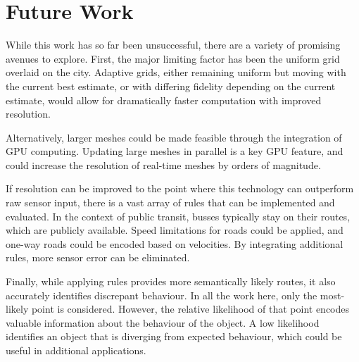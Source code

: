 \section{Future Work}

While this work has so far been unsuccessful, there are a variety of promising avenues to explore. First, the major limiting factor has been the uniform grid overlaid on the city. Adaptive grids, either remaining uniform but moving with the current best estimate, or with differing fidelity depending on the current estimate, would allow for dramatically faster computation with improved resolution.

Alternatively, larger meshes could be made feasible through the integration of GPU computing. Updating large meshes in parallel is a key GPU feature, and could increase the resolution of real-time meshes by orders of magnitude.

If resolution can be improved to the point where this technology can outperform raw sensor input, there is a vast array of rules that can be implemented and evaluated. In the context of public transit, busses typically stay on their routes, which are publicly available. Speed limitations for roads could be applied, and one-way roads could be encoded based on velocities.
By integrating additional rules, more sensor error can be eliminated.

Finally, while applying rules provides more semantically likely routes, it also accurately identifies discrepant behaviour. In all the work here, only the most-likely point is considered. However, the relative likelihood of that point encodes valuable information about the behaviour of the object. A low likelihood identifies an object that is diverging from expected behaviour, which could be useful in additional applications.
